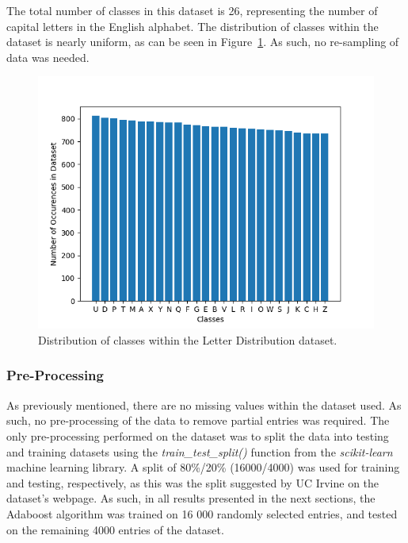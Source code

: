 \documentclass[a4paper]{article}
\begin{document}
The total number of classes in this dataset is 26, representing the number of capital letters in the English alphabet. The distribution of classes within the dataset is nearly uniform, as can be seen in Figure~\ref{fig:class-histogram}. As such, no re-sampling of data was needed.

\begin{figure}[h!]
    \centering
    \includegraphics[scale=0.7]{images/class-distribution.png}
    \caption{Distribution of classes within the Letter Distribution dataset.}
    \label{fig:class-histogram}
\end{figure}

\subsubsection{Pre-Processing}
As previously mentioned, there are no missing values within the dataset used. As such, no pre-processing of the data to remove partial entries was required. The only pre-processing performed on the dataset was to split the data into testing and training datasets using the \textit{train\_test\_split()} function from the \textit{scikit-learn} machine learning library. A split of 80\%/20\% (16000/4000) was used for training and testing, respectively, as this was the split suggested by UC Irvine on the dataset's webpage. As such, in all results presented in the next sections, the Adaboost algorithm was trained on 16 000 randomly selected entries, and tested on the remaining 4000 entries of the dataset.
\end{document}
